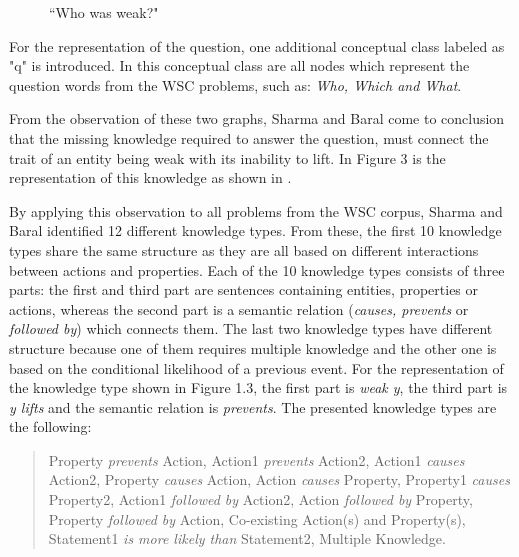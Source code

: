 \begin{figure}
	\centering
	
	\caption{\label{Graph12}``Who was weak?"}
\end{figure}

For the representation of the question, one additional conceptual class labeled as "q" is introduced. In this conceptual class are all nodes which represent the question words from the WSC problems, such as: \textit{Who, Which and What}.

From the observation of these two graphs, Sharma and Baral \cite{2018CommonsenseKT} come to conclusion that the missing knowledge required to answer the question, must connect the trait of an entity being weak with its inability to lift. In Figure 3 is the representation of this knowledge as shown in \cite{2018CommonsenseKT}. 

\begin{comment}
	content...

\begin{figure}
	\centering
	
	\caption{\label{Graph13}``Prevents type?"}
\end{figure}
\end{comment}

By applying this observation to all problems from the WSC corpus, Sharma and Baral \cite{2018CommonsenseKT} identified 12 different knowledge types. From these, the first 10 knowledge types share the same structure as they are all based on different interactions between actions and properties. Each of the 10 knowledge types consists of three parts: the first and third part are sentences containing entities, properties or actions, whereas the second part is a semantic relation (\textit{causes, prevents} or \textit{followed by}) which connects them. The last two knowledge types have different structure because one of them requires multiple knowledge and the other one is based on the conditional likelihood of a previous event. 
For the representation of the knowledge type shown in Figure 1.3, the first part is \textit{weak y}, the third part is \textit{y lifts} and the semantic relation is \textit{prevents}.
The presented knowledge types are the following:

\begin{quote} 
	Property \textit{prevents} Action, Action1 \textit{prevents} Action2, Action1 \textit{causes} Action2, Property \textit{causes} Action, Action \textit{causes} Property, Property1 \textit{causes} Property2, Action1 \textit{followed by} Action2, Action \textit{followed by} Property, Property \textit{followed by} Action, Co-existing Action(s) and Property(s), Statement1 \textit{is more likely than} Statement2, Multiple Knowledge. 
\end{quote}


